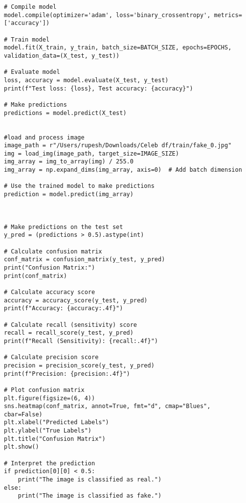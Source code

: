 \begin{verbatim}
# Compile model
model.compile(optimizer='adam', loss='binary_crossentropy', metrics=['accuracy'])

# Train model
model.fit(X_train, y_train, batch_size=BATCH_SIZE, epochs=EPOCHS, validation_data=(X_test, y_test))

# Evaluate model
loss, accuracy = model.evaluate(X_test, y_test)
print(f"Test loss: {loss}, Test accuracy: {accuracy}")

# Make predictions
predictions = model.predict(X_test)


#load and process image
image_path = r"/Users/rupesh/Downloads/Celeb df/train/fake_0.jpg"
img = load_img(image_path, target_size=IMAGE_SIZE)
img_array = img_to_array(img) / 255.0
img_array = np.expand_dims(img_array, axis=0)  # Add batch dimension

# Use the trained model to make predictions
prediction = model.predict(img_array)



# Make predictions on the test set
y_pred = (predictions > 0.5).astype(int)

# Calculate confusion matrix
conf_matrix = confusion_matrix(y_test, y_pred)
print("Confusion Matrix:")
print(conf_matrix)

# Calculate accuracy score
accuracy = accuracy_score(y_test, y_pred)
print(f"Accuracy: {accuracy:.4f}")

# Calculate recall (sensitivity) score
recall = recall_score(y_test, y_pred)
print(f"Recall (Sensitivity): {recall:.4f}")

# Calculate precision score
precision = precision_score(y_test, y_pred)
print(f"Precision: {precision:.4f}")

# Plot confusion matrix
plt.figure(figsize=(6, 4))
sns.heatmap(conf_matrix, annot=True, fmt="d", cmap="Blues", cbar=False)
plt.xlabel("Predicted Labels")
plt.ylabel("True Labels")
plt.title("Confusion Matrix")
plt.show()

# Interpret the prediction
if prediction[0][0] < 0.5:
    print("The image is classified as real.")
else:
    print("The image is classified as fake.")
\end{verbatim}






